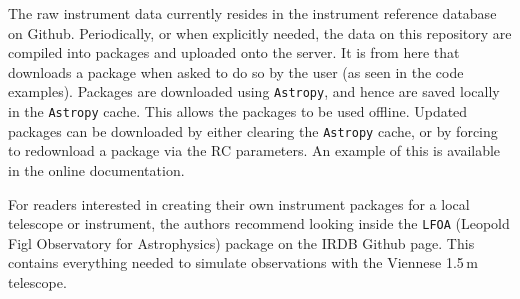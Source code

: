 The raw instrument data currently resides in the instrument reference database on Github.
Periodically, or when explicitly needed, the data on this repository are compiled into packages and uploaded onto the \ScopeSim{} server.
It is from here that \ScopeSim{} downloads a package when asked to do so by the user (as seen in the code examples).
Packages are downloaded using \lstinline{Astropy}, and hence are saved locally in the \lstinline{Astropy} cache.
This allows the packages to be used offline.
Updated packages can be downloaded by either clearing the \lstinline{Astropy} cache, or by forcing \scopesim{} to redownload a package via the RC parameters.
An example of this is available in the online documentation.

For readers interested in creating their own instrument packages for a local telescope or instrument, the authors recommend looking inside the \lstinline{LFOA} (Leopold Figl Observatory for Astrophysics) package on the IRDB Github page.
This contains everything needed to simulate observations with the Viennese 1.5\,m telescope.

